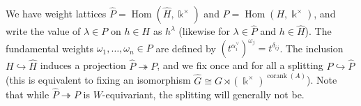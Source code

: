 \documentclass[12pt]{amsart}
\newcommand{\kk}{\Bbbk}%
\newcommand\onto{\twoheadrightarrow}
\newcommand\into{\hookrightarrow}
\DeclareMathOperator{\Hom}{Hom}
\DeclareMathOperator{\corank}{corank}
\theoremstyle{remark}
\numberwithin{equation}{section}
\begin{document}
We have weight lattices $\widehat{P} = \Hom(\widehat{H},\kk^\times)$ and $P = \Hom(H,\kk^\times)$, and write the value of $\lambda \in P$ on $h \in H$ as $h^\lambda$ (likewise for $\lambda \in \widehat{P}$ and $h \in \widehat{H}$). The fundamental weights $\omega_1,\dotsc,\omega_n \in P$ are defined by $(t^{\alpha_i^\vee})^{\omega_j} = t^{\delta_{ij}}$. The inclusion $H \into \widehat{H}$ induces a projection $\widehat{P} \onto P$, and we fix once and for all a splitting $P \into \widehat{P}$ (this is equivalent to fixing an isomorphism $\widehat{G} \cong G \rtimes (\kk^\times)^{\corank(A)}$). Note that while $\widehat{P} \onto P$ is $W$-equivariant, the splitting will generally not be.




\end{document}
